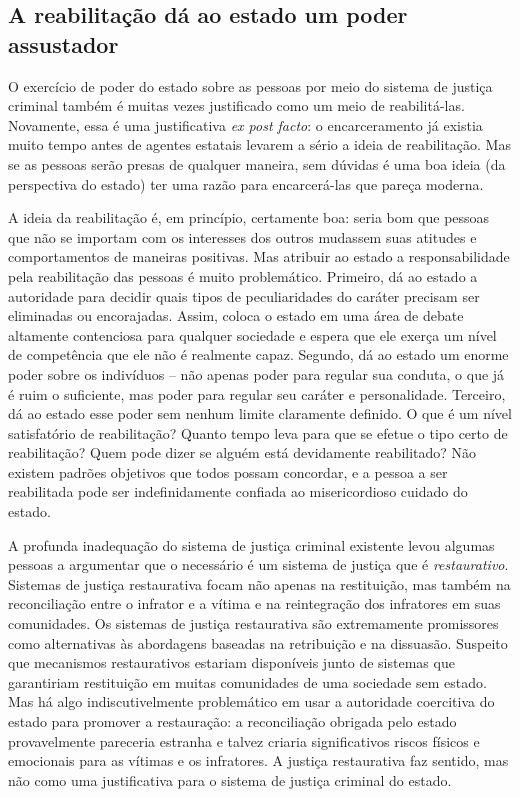 \subsection*{A reabilitação dá ao estado um poder assustador}

O exercício de poder do estado sobre as pessoas por meio do sistema de justiça criminal também é muitas vezes justificado como um meio de reabilitá-las. Novamente, essa é uma justificativa \emph{ex post facto}: o encarceramento já existia muito tempo antes de agentes estatais levarem a sério a ideia de reabilitação. Mas se as pessoas serão presas de qualquer maneira, sem dúvidas é uma boa ideia (da perspectiva do estado) ter uma razão para encarcerá-las que pareça moderna.

A ideia da reabilitação é, em princípio, certamente boa: seria bom que pessoas que não se importam com os interesses dos outros mudassem suas atitudes e comportamentos de maneiras positivas. Mas atribuir ao estado a responsabilidade pela reabilitação das pessoas é muito problemático. Primeiro, dá ao estado a autoridade para decidir quais tipos de peculiaridades do caráter precisam ser eliminadas ou encorajadas. Assim, coloca o estado em uma área de debate altamente contenciosa para qualquer sociedade e espera que ele exerça um nível de competência que ele não é realmente capaz. Segundo, dá ao estado um enorme poder sobre os indivíduos -- não apenas poder para regular sua conduta, o que já é ruim o suficiente, mas poder para regular seu caráter e personalidade. Terceiro, dá ao estado esse poder sem nenhum limite claramente definido. O que é um nível satisfatório de reabilitação? Quanto tempo leva para que se efetue o tipo certo de reabilitação? Quem pode dizer se alguém está devidamente reabilitado? Não existem padrões objetivos que todos possam concordar, e a pessoa a ser reabilitada pode ser indefinidamente confiada ao misericordioso cuidado do estado.

A profunda inadequação do sistema de justiça criminal existente levou algumas pessoas a argumentar que o necessário é um sistema de justiça que é \emph{restaurativo}. Sistemas de justiça restaurativa focam não apenas na restituição, mas também na reconciliação entre o infrator e a vítima e na reintegração dos infratores em suas comunidades. Os sistemas de justiça restaurativa são extremamente promissores como alternativas às abordagens baseadas na retribuição e na dissuasão. Suspeito que mecanismos restaurativos estariam disponíveis junto de sistemas que garantiriam restituição em muitas comunidades de uma sociedade sem estado. Mas há algo indiscutivelmente problemático em usar a autoridade coercitiva do estado para promover a restauração: a reconciliação obrigada pelo estado provavelmente pareceria estranha e talvez criaria significativos riscos físicos e emocionais para as vítimas e os infratores. A justiça restaurativa faz sentido, mas não como uma justificativa para o sistema de justiça criminal do estado.

